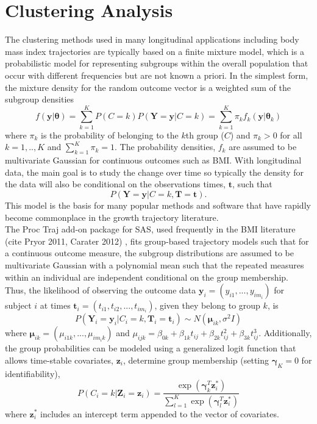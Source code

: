 \documentclass[11pt]{article}
\newcommand{\B}[0]{\mathbf}
\newcommand{\bs}[0]{\boldsymbol}
\begin{document}
\section{Clustering Analysis}
The clustering methods used in many longitudinal applications including body mass index trajectories are typically based on a finite mixture model, which is a probabilistic model for representing subgroups within the overall population that occur with different frequencies but are not known a priori. In the simplest form, the mixture density for the random outcome vector is a weighted sum of the subgroup densities
$$f(\B y|\bs\theta) = \sum^{K}_{k=1}P(C=k)P(\B Y=\B y|C=k) = \sum^{K}_{k=1}\pi_{k}f_{k}(\B y|\bs\theta_{k})$$
where $\pi_{k}$ is the probability of belonging to the $k$th group ($C$) and $\pi_{k}>0$ for all $k=1,..,K$ and $\sum^{K}_{k=1}\pi_{k}=1$. The probability densities, $f_{k}$ are assumed to be multivariate Gaussian for continuous outcomes such as BMI. With longitudinal data, the main goal is to study the change over time so typically the density for the data will also be conditional on the observations times, $\B t$, such that $$P(\B Y =\B y |C=k,\B T = \B t).$$
This model is the basis for many popular methods and software that have rapidly become commonplace in the growth trajectory literature.\\

The Proc Traj add-on package for SAS, used frequently in the BMI literature (cite Pryor 2011, Carater 2012) , fits group-based trajectory models such that for a continuous outcome measure, the subgroup distributions are assumed to be multivariate Gaussian with a polynomial mean such that the repeated measures within an individual are independent conditional on the group membership. Thus, the likelihood of observing the outcome data $\B y_{i} = (y_{i1},...,y_{im_{i}})$ for subject $i$ at times $\B t_{i} = (t_{i1},t_{i2},...,t_{im_{i}})$, given they belong to group $k$, is
$$P(\B Y_{i} = \B y_{i}|C_{i}=k,\B T_{i}=\B t_{i})\sim N(\bs\mu_{ik},\sigma^{2}I)$$
where $\bs\mu_{ik} = (\mu_{i1k},...,\mu_{im_{i}k})$ and $\mu_{ijk} = \beta_{0k}+\beta_{1k} t_{ij} + \beta_{2k}t_{ij}^{2}+ \beta_{3k} t_{ij}^{3}$. Additionally, the group probabilities can be modeled using a generalized logit function that allows time-stable covariates, $\B z_{i}$, determine group membership (setting $\bs\gamma_{K}=0$ for identifiability),
$$P(C_{i}=k|\B Z_{i}=\B z_{i}) = \frac{\exp(\bs\gamma_{k}^{T}\B z^{*}_{i})}{\sum^{K}_{l=1}\exp(\bs\gamma_{l}^{T}\B z^{*}_{i})}$$
where $\B z^{*}_{i} $ includes an intercept term appended to the vector of covariates. \\
\end{document}
